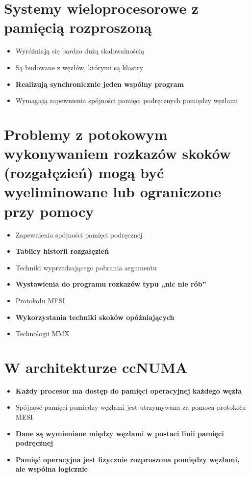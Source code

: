 \documentclass[a4paper,twoside]{article}
\begin{document}
\section{Systemy wieloprocesorowe z pamięcią rozproszoną}
	\begin{itemize}
    \item Wyróżniają się bardzo dużą skalowalnością
    \item Są budowane z węzłów, którymi są klastry
    \item \textbf{Realizują synchronicznie jeden wspólny program}
    \item Wymagają zapewnienia spójności pamięci podręcznych pomiędzy węzłami
    \end{itemize}

\section{Problemy z potokowym wykonywaniem rozkazów skoków (rozgałęzień) mogą być wyeliminowane lub ograniczone przy pomocy}
	\begin{itemize}
    \item Zapewnienia spójności pamięci podręcznej
    \item \textbf{Tablicy historii rozgałęzień}
    \item Techniki wyprzedzającego pobrania argumentu
    \item \textbf{Wystawienia do programu rozkazów typu „nic nie rób”}
    \item Protokołu MESI
    \item \textbf{Wykorzystania techniki skoków opóźniających}
    \item Technologii MMX
    \end{itemize}

\section{W architekturze ccNUMA}
	\begin{itemize}
    \item \textbf{Każdy procesor ma dostęp do pamięci operacyjnej każdego węzła}
    \item Spójność pamięci pomiędzy węzłami jest utrzymywana za pomocą protokołu MESI
    \item \textbf{Dane są wymieniane między węzłami w postaci linii pamięci podręcznej}
    \item \textbf{Pamięć operacyjna jest fizycznie rozproszona pomiędzy węzłami, ale wspólna logicznie}
    \end{itemize}
\end{document}
